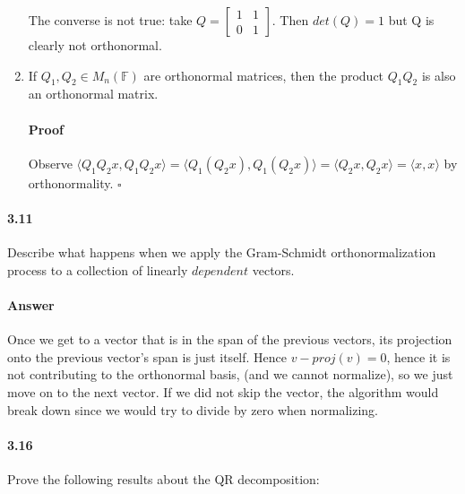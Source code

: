 \documentclass[letterpaper,12pt]{article}
\theoremstyle{definition}
\begin{document}
\begin{enumerate}[label=(\roman*)]
The converse is not true: take $Q = \begin{bmatrix}
    1 & 1 \\
    0 & 1 
  \end{bmatrix} $. Then $det(Q) = 1$ but Q is clearly not orthonormal.

\item If $Q_1, Q_2 \in M_n(\mathds{F})$ are orthonormal matrices, then the product $Q_1Q_2$ is also an orthonormal matrix.
\paragraph{Proof} Observe $\langle Q_1Q_2x, Q_1Q_2x \rangle = \langle Q_1(Q_2x), Q_1(Q_2x) \rangle = \langle Q_2x, Q_2x \rangle = \langle x, x \rangle$ by orthonormality. $\square$

\end{enumerate}

\paragraph{3.11} Describe what happens when we apply the Gram-Schmidt orthonormalization process to a collection of linearly $dependent$ vectors.

\paragraph{Answer} Once we get to a vector  that is in the span of the previous vectors, its projection onto the previous vector's span is just itself. Hence $v - proj(v) = 0$, hence it is not contributing to the orthonormal basis, (and we cannot normalize), so we just move on to the next vector. If we did not skip the vector, the algorithm would break down since we would try to divide by zero when normalizing.


\paragraph{3.16} Prove the following results about the QR decomposition: 
\end{document}
